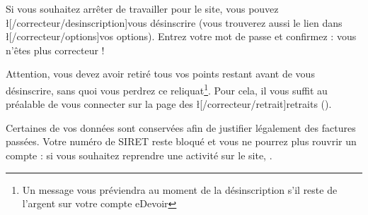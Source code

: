 ﻿Si vous souhaitez arrêter de travailler pour le site, vous pouvez \l[/correcteur/desinscription]{vous désinscrire} (vous trouverez aussi le lien dans \l[/correcteur/options]{vos options}).
Entrez votre mot de passe et confirmez : vous n’êtes plus correcteur !

Attention, vous devez avoir retiré tous vos points restant avant de vous désinscrire, sans quoi vous perdrez ce reliquat\footnote{Un message vous préviendra au moment de la désinscription s’il reste de l’argent sur votre compte eDevoir}. Pour cela, il vous suffit au préalable de vous connecter sur la page des \l[/correcteur/retrait]{retraits} ().

Certaines de vos données sont conservées afin de justifier légalement des factures passées. Votre numéro de SIRET reste bloqué et vous ne pourrez plus rouvrir un compte : si vous souhaitez reprendre une activité sur le site, .